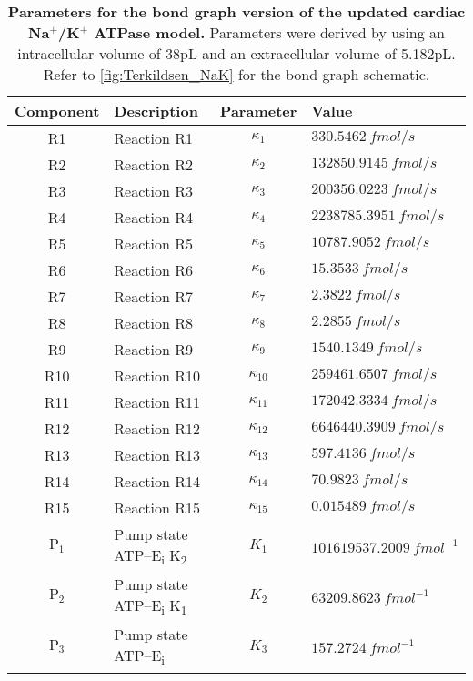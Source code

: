 \documentclass[11pt]{article}
\begin{document}
\begin{table}[H]
	\caption{\textbf{Parameters for the bond graph version of the updated cardiac Na$^+$/K$^+$ ATPase model.} Parameters were derived by using an intracellular volume of 38pL and an extracellular volume of 5.182pL. Refer to \autoref{fig:Terkildsen_NaK} for the bond graph schematic.}
	\centering
	\begin{tabular}{cl c l}
		\toprule
		\textbf{Component} & \textbf{Description}& \textbf{Parameter} & \textbf{Value} \\ \midrule
		R1 & Reaction R1 & $\kappa_1$ & $ 330.5462\ \si{fmol/s} $\\ 
		R2 & Reaction R2 & $\kappa_2$ & $ 132850.9145\ \si{fmol/s} $\\ 
		R3 & Reaction R3 & $\kappa_3$ & $ 200356.0223\ \si{fmol/s} $\\ 
		R4 & Reaction R4 & $\kappa_4$ & $ 2238785.3951\ \si{fmol/s} $\\ 
		R5 & Reaction R5 & $\kappa_5$ & $ 10787.9052\ \si{fmol/s} $\\ 
		R6 & Reaction R6 & $\kappa_6$ & $ 15.3533\ \si{fmol/s} $\\ 
		R7 & Reaction R7 & $\kappa_7$ & $ 2.3822\ \si{fmol/s} $\\ 
		R8 & Reaction R8 & $\kappa_8$ & $ 2.2855\ \si{fmol/s} $\\ 
		R9 & Reaction R9 & $\kappa_9$ & $ 1540.1349\ \si{fmol/s} $\\ 
		R10 & Reaction R10 & $\kappa_{10}$ & $ 259461.6507\ \si{fmol/s} $\\ 
		R11 & Reaction R11 & $\kappa_{11}$ & $ 172042.3334\ \si{fmol/s} $\\ 
		R12 & Reaction R12 & $\kappa_{12}$ & $ 6646440.3909\ \si{fmol/s} $\\ 
		R13 & Reaction R13 & $\kappa_{13}$ & $ 597.4136\ \si{fmol/s} $\\ 
		R14 & Reaction R14 & $\kappa_{14}$ & $ 70.9823\ \si{fmol/s} $\\ 
		R15 & Reaction R15 & $\kappa_{15}$ & $ 0.015489\ \si{fmol/s} $\\ 
		$\text{P}_1$ & Pump state ATP--E\textsubscript{i} K\textsubscript{2}
		 & $K_1$ & $101619537.2009\ \si{fmol^{-1}}$ \\ 
		$\text{P}_2$ & Pump state ATP--E\textsubscript{i} K\textsubscript{1}
		 & $K_2$ & $63209.8623\ \si{fmol^{-1}}$ \\ 
		$\text{P}_3$ & Pump state ATP--E\textsubscript{i}
		 & $K_3$ & $157.2724\ \si{fmol^{-1}}$ \\ 

\end{tabular}
\end{table}
\end{document}
